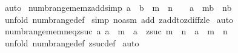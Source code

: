 \begin{isabellebody}
%
\isadelimproof
%
\endisadelimproof
%
\isatagproof
{}\isamarkupfalse%
\ auto\isanewline
{}\isamarkupfalse%
%
\endisatagproof
{\isafoldproof}%
%
\isadelimproof
\isanewline
%
\endisadelimproof
\isanewline
\isanewline
{}\isamarkupfalse%
\ numb{\isacharunderscore}range{\isacharunderscore}mem{\isacharunderscore}zadd{\isacharbrackleft}simp{\isacharbrackright}{\isacharcolon}\ {\isachardoublequoteopen}{\isacharparenleft}{\isacharparenleft}a\ {\isacharplus}\ b{\isacharparenright}\ {\isacharcolon}\ {\isacharparenleft}m\ {\isachardot}{\isachardot}\ n{\isacharparenright}{\isacharparenright}\ \ {\isacharequal}\ \ {\isacharparenleft}a\ {\isacharcolon}\ {\isacharparenleft}m{\isacharminus}b\ {\isachardot}{\isachardot}\ n{\isacharminus}b{\isacharparenright}{\isacharparenright}{\isachardoublequoteclose}\isanewline
%
\isadelimproof
%
\endisadelimproof
%
\isatagproof
{}\isamarkupfalse%
\ {\isacharparenleft}unfold\ numb{\isacharunderscore}range{\isacharunderscore}def{\isacharparenright}\isanewline
{}\isamarkupfalse%
\ {\isacharparenleft}simp\ {\isacharparenleft}no{\isacharunderscore}asm{\isacharparenright}\ add{\isacharcolon}\ zadd{\isacharunderscore}to{\isacharunderscore}zdiff{\isacharunderscore}zle{\isacharparenright}\isanewline
{}\isamarkupfalse%
\ auto\isanewline
{}\isamarkupfalse%
%
\endisatagproof
{\isafoldproof}%
%
\isadelimproof
\isanewline
%
\endisadelimproof
\ \isanewline
\isanewline
{}\isamarkupfalse%
\ numb{\isacharunderscore}range{\isacharunderscore}mem{\isacharunderscore}neq{\isacharunderscore}zsuc{\isacharcolon}\ {\isachardoublequoteopen}{\isacharbang}{\isacharbang}a{\isachardot}\ a\ {\isachartilde}{\isacharequal}\ m\ {\isacharequal}{\isacharequal}{\isachargreater}\ {\isacharparenleft}a\ {\isacharcolon}\ {\isacharparenleft}zsuc\ m\ {\isachardot}{\isachardot}\ n{\isacharparenright}{\isacharparenright}\ {\isacharequal}\ {\isacharparenleft}a\ {\isacharcolon}\ {\isacharparenleft}m\ {\isachardot}{\isachardot}\ n{\isacharparenright}{\isacharparenright}{\isachardoublequoteclose}\isanewline
%
\isadelimproof
%
\endisadelimproof
%
\isatagproof
{}\isamarkupfalse%
\ {\isacharparenleft}unfold\ numb{\isacharunderscore}range{\isacharunderscore}def\ zsuc{\isacharunderscore}def{\isacharparenright}\isanewline
{}\isamarkupfalse%
\ auto\isanewline
{}\isamarkupfalse%
%
\endisatagproof
{\isafoldproof}%
%
\isadelimproof
\isanewline
%
\endisadelimproof
\isanewline
\isanewline
\isanewline
{}\isamarkupfalse%

\end{isabellebody}
